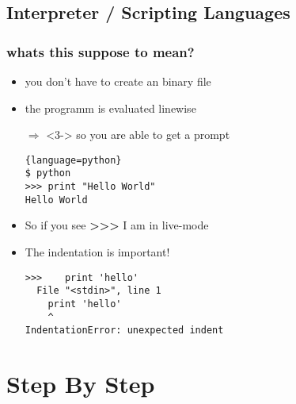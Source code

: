 \documentclass[hyperref={pdfpagelabels=false}]{beamer}
\begin{document}
    \subsection{Interpreter / Scripting Languages} 
		\begin{frame}[fragile]
			\frametitle{whats this suppose to mean?}
			\begin{itemize}
                \item<1-> you don't have to create an binary file
                \item<2-> the programm is evaluated linewise
                \item[$\Rightarrow$]<3-> so you are able to get a prompt
                \begin{lstlisting}{language=python}
$ python
>>> print "Hello World"
Hello World
\end{lstlisting}
                \item<3-> So if you see \textbf{\textgreater \textgreater \textgreater} I am in live-mode
                \item<4-> The indentation is important!
                    \begin{lstlisting}
>>>    print 'hello'
  File "<stdin>", line 1
    print 'hello'
    ^
IndentationError: unexpected indent
\end{lstlisting}
            \end{itemize}
		\end{frame}
\section{Step By Step}
\end{document}
